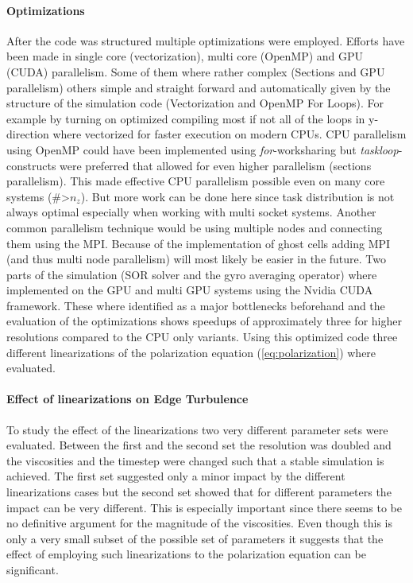 \documentclass[master.tex]{subfiles}
\begin{document}
\paragraph{Optimizations}
After the code was structured multiple optimizations were employed. Efforts have been made in single core (vectorization), multi core (OpenMP) and GPU (CUDA) parallelism. Some of them where rather complex (Sections and GPU parallelism) others simple and straight forward and automatically given by the structure of the simulation code (Vectorization and OpenMP For Loops). For example by turning on optimized compiling most if not all of the loops in y-direction where vectorized for faster execution on modern CPUs.\newline
CPU parallelism using OpenMP could have been implemented using \textit{for}-worksharing but \textit{taskloop}-constructs were preferred that allowed for even higher parallelism (sections parallelism). This made effective CPU parallelism possible even on many core systems (\#>$n_z$). But more work can be done here since task distribution is not always optimal especially when working with multi socket systems. Another common parallelism technique would be using multiple nodes and connecting them using the \ac{MPI}. Because of the implementation of ghost cells adding \ac{MPI} (and thus multi node parallelism) will most likely be easier in the future.\newline
Two parts of the simulation (\ac{SOR} solver and the gyro averaging operator) where implemented on the GPU and multi GPU systems using the Nvidia CUDA framework. These where identified as a major bottlenecks beforehand and the evaluation of the optimizations shows speedups of approximately three for higher resolutions compared to the CPU only variants. Using this optimized code three different linearizations of the polarization equation (\autoref{eq:polarization}) where evaluated.

\paragraph{Effect of linearizations on Edge Turbulence}
To study the effect of the linearizations two very different parameter sets were evaluated. Between the first and the second set the resolution was doubled and the viscosities and the timestep were changed such that a stable simulation is achieved. The first set suggested only a minor impact by the different linearizations cases but the second set showed that for different parameters the impact can be very different. This is especially important since there seems to be no definitive argument for the magnitude of the viscosities.\newline
Even though this is only a very small subset of the possible set of parameters it suggests that the effect of employing such linearizations to the polarization equation can be significant. 
\end{document}
